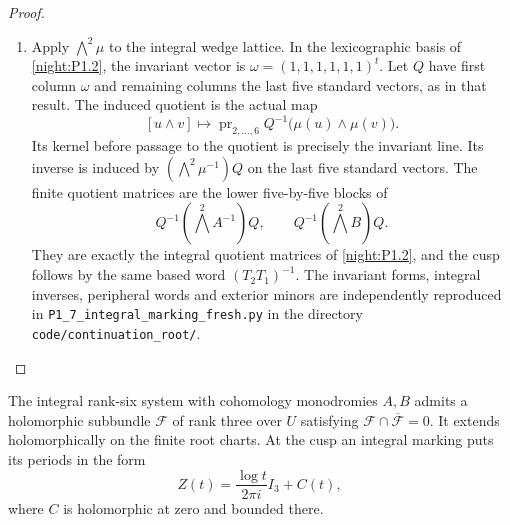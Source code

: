 \begin{proof}
\begin{enumerate}[label=\arabic*.]
\item Apply $\bigwedge^2\mu$ to the integral wedge lattice. In the
lexicographic basis of \cref{night:P1.2}, the invariant vector is
$\omega=(1,1,1,1,1,1)^t$. Let $Q$ have first column $\omega$ and
remaining columns the last five standard vectors, as in that result.
The induced quotient is the actual map
\[
 [u\wedge v]\longmapsto
 \operatorname{pr}_{2,\ldots,6}
 Q^{-1}\bigl(\mu(u)\wedge\mu(v)\bigr).
\]
Its kernel before passage to the quotient is precisely the invariant
line. Its inverse is induced by $(\bigwedge^2\mu^{-1})Q$ on the last
five standard vectors. The finite quotient matrices are the lower
five-by-five blocks of
\[
 Q^{-1}(\bigwedge^2 A^{-1})Q,\qquad
 Q^{-1}(\bigwedge^2 B)Q.
\]
They are exactly the integral quotient matrices of
\cref{night:P1.2}, and the cusp follows by the same based word
$(T_2T_1)^{-1}$. The invariant forms, integral inverses, peripheral
words and exterior minors are independently reproduced in
\texttt{P1\_7\_integral\_marking\_fresh.py} in the directory 
\texttt{code/continuation\_root/}.
\end{enumerate}
\end{proof}




\begin{theorem}\label{maps:src:F.3.6}


The integral rank-six system with cohomology monodromies $A,B$
admits a holomorphic subbundle $\mathcal F$ of rank three over
$U$ satisfying $\mathcal F\cap\overline{\mathcal F}=0$.
It extends holomorphically on the finite root charts.  At the
cusp an integral marking puts its periods in the form
\[
 Z(t)=\frac{\log t}{2\pi i}I_3+C(t),
 \tag{F.13}\label{maps:eq:F.13}
\]
where $C$ is holomorphic at zero and bounded there.

\end{theorem}


